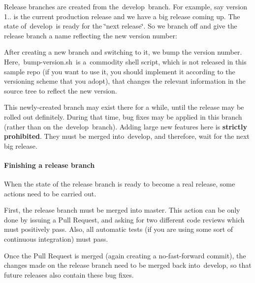 Release branches are created from the {\ttfamily develop} branch. For example, say version 1.. is the current production release and we have a big release coming up. The state of develop is ready for the \char`\"{}next release\char`\"{}. So we branch off and give the release branch a name reflecting the new version number\+:




After creating a new branch and switching to it, we bump the version number. Here, {\ttfamily bump-\/version.\+sh} is a commodity shell script, which is not released in this sample repo (if you want to use it, you should implement it according to the versioning scheme that you adopt), that changes the relevant information in the source tree to reflect the new version.

This newly-\/created branch may exist there for a while, until the release may be rolled out definitely. During that time, bug fixes may be applied in this branch (rather than on the {\ttfamily develop} branch). Adding large new features here is {\bfseries strictly prohibited}. They must be merged into {\ttfamily develop}, and therefore, wait for the next big release.

\paragraph*{Finishing a release branch }

When the state of the release branch is ready to become a real release, some actions need to be carried out.

First, the release branch must be merged into {\ttfamily master}. This action can be only done by issuing a Pull Request, and asking for two different code reviews which must positively pass. Also, all automatic tests (if you are using some sort of continuous integration) must pass.

Once the Pull Request is merged (again creating a no-\/fast-\/forward commit), the changes made on the release branch need to be merged back into {\ttfamily develop}, so that future releases also contain these bug fixes.

